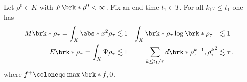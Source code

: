 \begin{frame}
  \begin{proposition}
    Let $\rho^0\in K$ with $F\brk*{\rho^0}<\infty$.
    Fix an end time $t_1\in T$.
    For all $k_1\tau\leq t_1$ one has 
    \begin{align*}
      M\brk*{\rho_\tau}=\int_X\abs*{x}^2\rho_\tau&\lesssim 1 &  
      \int_X \brk*{\rho_\tau\log\brk*{\rho_\tau}}^+ &\lesssim 1 \\
      E\brk*{\rho_\tau}=\int_X\Psi\rho_\tau &\lesssim 1 &
      \sum_{k\leq t_1/\tau}d\brk*{\rho_\tau^{k-1},\rho_\tau^k}^2 &\lesssim \tau\,.
    \end{align*}
    where $f^+\coloneqq\max\brk*{f,0}$.
  \end{proposition}



\end{frame}
